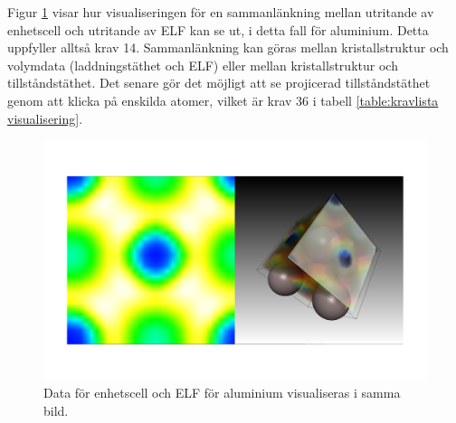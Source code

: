 \documentclass[a4paper,12pt]{article}
\begin{document}
Figur \ref{fig:visualisering_sammanlankning} visar hur visualiseringen för en sammanlänkning mellan utritande av enhetscell och utritande av ELF kan se ut, i detta fall för aluminium. Detta uppfyller alltså krav 14. Sammanlänkning kan göras mellan kristallstruktur och volymdata (laddningstäthet och ELF) eller mellan kristallstruktur och tillståndstäthet. Det senare gör det möjligt att se projicerad tillståndstäthet genom att klicka på enskilda atomer, vilket är krav 36 i tabell \ref{table:kravlista visualisering}.
\begin{figure}[H]
	\centering
	\includegraphics[scale=0.2]{sammanlankning_visualisering_Al.png}
	\caption{Data för enhetscell och ELF för aluminium visualiseras i samma bild.}
	\label{fig:visualisering_sammanlankning}
\end{figure}
\end{document}
